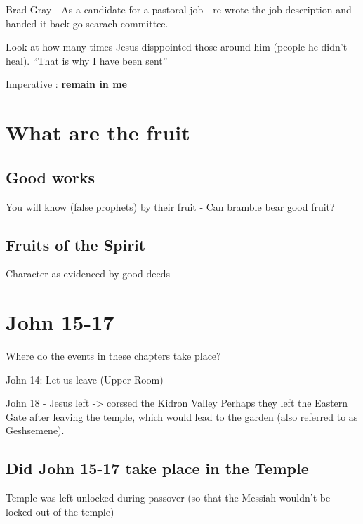 \documentclass[
]{book}
\begin{document}
Brad Gray - As a candidate for a pastoral job - re-wrote the job description and handed it back go searach committee.

Look at how many times Jesus disppointed those around him (people he didn't heal). ``That is why I have been sent''

Imperative : \textbf{remain in me}

\hypertarget{what-are-the-fruit}{%
\section{What are the fruit}\label{what-are-the-fruit}}

\hypertarget{good-works}{%
\subsection{Good works}\label{good-works}}

You will know (false prophets) by their fruit - Can bramble bear good fruit?

\hypertarget{fruits-of-the-spirit}{%
\subsection{Fruits of the Spirit}\label{fruits-of-the-spirit}}

Character as evidenced by good deeds

\hypertarget{john-15-17}{%
\section{John 15-17}\label{john-15-17}}

Where do the events in these chapters take place?

John 14: Let us leave (Upper Room)

John 18 - Jesus left -\textgreater{} corssed the Kidron Valley
Perhaps they left the Eastern Gate after leaving the temple, which would lead to the garden (also referred to as Geshsemene).

\hypertarget{did-john-15-17-take-place-in-the-temple}{%
\subsection{Did John 15-17 take place in the Temple}\label{did-john-15-17-take-place-in-the-temple}}

Temple was left unlocked during passover (so that the Messiah wouldn't be locked out of the temple)
\end{document}

